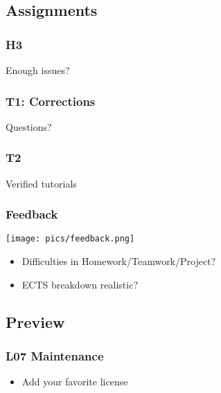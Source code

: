 \breakframe

\subsection{Assignments}

\begin{assignment}
	\frametitle{H3}

	\begin{task}
	Enough issues?
	\end{task}
\end{assignment}

\begin{assignment}
	\frametitle{T1: Corrections}

	\begin{task}
	Questions?
	\end{task}
\end{assignment}

\begin{assignment}
	\frametitle{T2}

	\begin{task}
	Verified tutorials
	\end{task}
\end{assignment}


\begin{frame}
	\frametitle{Feedback}

	\hfill \texttt{[image: pics/feedback.png]}
	\vspace{-1cm}
	\begin{itemize}[<+-| alert@+>]
		\item Difficulties in Homework/Teamwork/Project?
		\item ECTS breakdown realistic?
	\end{itemize}
\end{frame}

\subsection{Preview}

\begin{frame}
	\frametitle{L07 Maintenance}

	\begin{itemize} %
		\item Add your favorite license
	\end{itemize}
\end{frame}


\appendix

\begin{frame}[allowframebreaks]
	
	
\end{frame}



